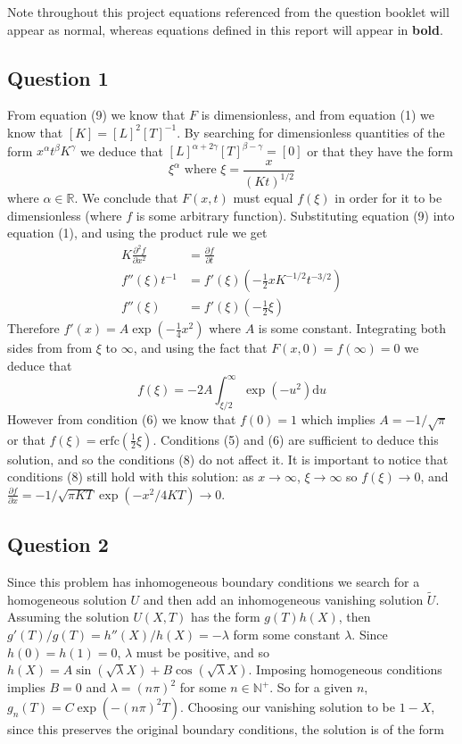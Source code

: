 \documentclass[10pt,a4paper,notitlepage]{article}
\author{Jonah Gibbon}
\newcommand{\N}{\mathbb{N}}
\newcommand{\R}{\mathbb{R}}
\newcommand{\erfc}{\text{erfc}}
\begin{document}
Note throughout this project equations referenced from the question booklet will appear as normal, whereas equations defined in this report will appear in \textbf{bold}.
\subsection*{\centering Question 1}
From equation (9) we know that $F$ is dimensionless, and from equation (1) we know that $[K]=[L]^{2}[T]^{-1}$. By searching for dimensionless quantities of the form $x^{\alpha}t^{\beta}K^{\gamma}$ we deduce that $[L]^{\alpha+2\gamma}[T]^{\beta-\gamma}=[0]$ or that they have the form 
\begin{equation}
\xi ^{\alpha} \textrm{ where } \xi=\frac{x}{(Kt)^{1/2}}
\end{equation}
where $\alpha\in\R$. We conclude that $F(x,t)$ must equal $f(\xi)$ in order for it to be dimensionless (where $f$ is some arbitrary function). Substituting equation (9) into equation (1), and using the product rule we get
\begin{equation}
\begin{aligned}
K\frac{\partial^{2} f}{\partial x^{2}} &= \frac{\partial f}{\partial t} \\
f''(\xi)t^{-1} &= f'(\xi)\left( -\frac{1}{2}xK^{-1/2}t^{-3/2}\right) \\ 
f''(\xi) &= f'(\xi)\left( -\frac{1}{2}\xi\right)
\end{aligned}
\end{equation}
Therefore $f'(x)=A \exp(-\frac{1}{4}x^{2})$ where $A$ is some constant. Integrating both sides from from $\xi$ to $\infty$, and using the fact that $F(x,0)=f(\infty)=0$   we deduce that
\begin{equation}
f(\xi)=-2A\int^{\infty}_{\xi/2}\exp\left( -u^{2}\right) \mathrm{d}u
\end{equation}
However from condition (6) we know that $f(0)=1$ which implies $A=-1/\sqrt{\pi}$ or that $f(\xi)=\erfc(\frac{1}{2}\xi)$. Conditions (5) and (6) are sufficient to deduce this solution, and so the conditions (8) do not affect it. It is important to notice that conditions (8) still hold with this solution: as $x\rightarrow \infty$, $\xi\rightarrow \infty$ so $f(\xi)\rightarrow 0$, and $\frac{\partial f}{\partial x}=-1/\sqrt{\pi KT}\exp\left(-x^{2}/4KT\right)\rightarrow 0$.
\subsection*{\centering Question 2}
Since this problem has inhomogeneous boundary conditions we search for a homogeneous solution $U$ and then add an inhomogeneous vanishing solution $\widetilde{U}$. Assuming the solution $U(X,T)$ has the form $g(T)h(X)$, then $g'(T)/g(T)=h''(X)/h(X)=-\lambda$ form some constant $\lambda$. Since $h(0)=h(1)=0$, $\lambda$ must be positive, and so $h(X)=A\sin(\sqrt{\lambda}X)+B\cos(\sqrt{\lambda}X)$. Imposing homogeneous conditions implies $B=0$ and $\lambda=(n\pi)^{2}$ for some $n\in \N^{+}$. So for a given $n$, $g_{n}(T)=C\exp(-(n\pi)^{2}T)$.  Choosing our vanishing solution to be $1-X$, since this preserves the original boundary conditions, the solution is of the form
\end{document}
